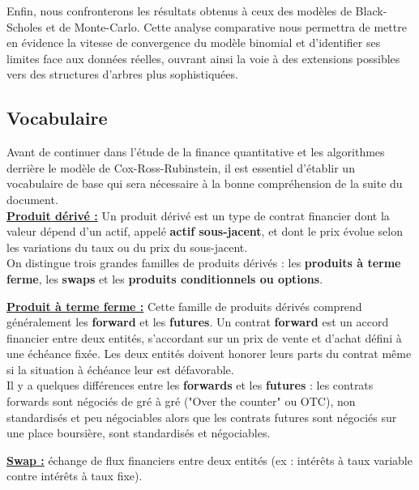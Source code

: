 Enfin, nous confronterons les résultats obtenus à ceux des modèles de Black-Scholes et de Monte-Carlo. Cette analyse comparative nous permettra de mettre en évidence la vitesse de convergence du modèle binomial et d'identifier ses limites face aux données réelles, ouvrant ainsi la voie à des extensions possibles vers des structures d'arbres plus sophistiquées. \\

\pagebreak

\subsection{Vocabulaire}
Avant de continuer dans l'étude de la finance quantitative et les algorithmes derrière le modèle de Cox-Ross-Rubinstein, il est essentiel d'établir un vocabulaire de base qui sera nécessaire à la bonne compréhension de la suite du document.\\

\underline{\textbf{Produit dérivé :}} Un produit dérivé est un type de contrat financier dont la valeur dépend d'un actif, appelé \textbf{actif sous-jacent}, et dont le prix évolue selon les variations du taux ou du prix du sous-jacent. \\
On distingue trois grandes familles de produits dérivés : les \textbf{produits à terme ferme}, les \textbf{swaps} et les \textbf{produits conditionnels ou options}. \cite{ActifSousJacent} \cite{ProduitDerive} \cite{ProduitsDerives}

\underline{\textbf{Produit à terme ferme :}} Cette famille de produits dérivés comprend généralement les \textbf{forward} et les \textbf{futures}. Un contrat \textbf{forward} est un accord financier entre deux entités, s'accordant sur un prix de vente et d'achat défini à une échéance fixée. Les deux entités doivent honorer leurs parts du contrat même si la situation à  échéance leur est défavorable. \\
Il y a quelques différences entre les \textbf{forwards} et les  \textbf{futures} : les contrats forwards sont négociés de gré à gré ("Over the counter" ou OTC), non standardisés et peu négociables alors que les contrats futures sont négociés sur une place boursière, sont standardisés et négociables. \cite{Forward} \cite{Swap}

\underline{\textbf{Swap :}} échange de flux financiers entre deux entités (ex : intérêts à taux variable contre intérêts à taux fixe).

